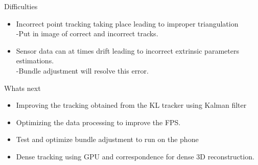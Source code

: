 \documentclass{beamer}
\begin{document}
\begin{frame}{Difficulties}{}
	\begin{itemize}
		\item Incorrect point tracking taking place leading to improper triangulation \\-Put in image of correct and incorrect tracks.
    \vspace{5mm}
		\item Sensor data can at times drift leading to incorrect extrinsic parameters estimations. \\-Bundle adjustment will resolve this error.
	\end{itemize}
\end{frame}

\begin{frame}{Whats next}{}
	\begin{itemize}
		\item Improving the tracking obtained from the KL tracker using Kalman filter
		\item Optimizing the data processing to improve the FPS. 
    \item Test and optimize bundle adjustment to run on the phone
		\item Dense tracking using GPU and correspondence for dense 3D reconstruction.
	\end{itemize}
\end{frame}

\end{document}
